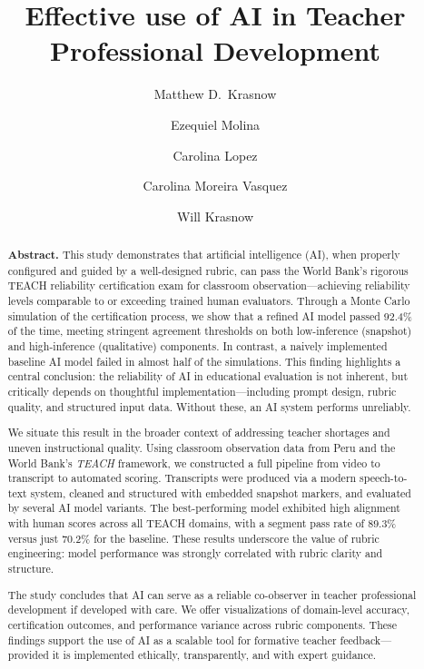 \documentclass[12pt]{article}
\begin{document}
\title{Effective use of AI in Teacher Professional Development}
\author[1]{Matthew D.\ Krasnow}
\author[2]{Ezequiel Molina}
\author[2]{Carolina Lopez}
\author[3]{Carolina Moreira Vasquez}
\author[1]{Will Krasnow}


\date{}
\maketitle

\begin{abstract}
    \noindent \textbf{Abstract.} This study demonstrates that artificial intelligence (AI), when properly configured and guided by a well-designed rubric, can pass the World Bank’s rigorous TEACH reliability certification exam for classroom observation—achieving reliability levels comparable to or exceeding trained human evaluators. Through a Monte Carlo simulation of the certification process, we show that a refined AI model passed 92.4\% of the time, meeting stringent agreement thresholds on both low-inference (snapshot) and high-inference (qualitative) components. In contrast, a naively implemented baseline AI model failed in almost half of the simulations. This finding highlights a central conclusion: the reliability of AI in educational evaluation is not inherent, but critically depends on thoughtful implementation—including prompt design, rubric quality, and structured input data. Without these, an AI system performs unreliably.
    
    We situate this result in the broader context of addressing teacher shortages and uneven instructional quality. Using classroom observation data from Peru and the World Bank’s \textit{TEACH} framework, we constructed a full pipeline from video to transcript to automated scoring. Transcripts were produced via a modern speech-to-text system, cleaned and structured with embedded snapshot markers, and evaluated by several AI model variants. The best-performing model exhibited high alignment with human scores across all TEACH domains, with a segment pass rate of 89.3\% versus just 70.2\% for the baseline. These results underscore the value of rubric engineering: model performance was strongly correlated with rubric clarity and structure.
    
    The study concludes that AI can serve as a reliable co-observer in teacher professional development if developed with care. We offer visualizations of domain-level accuracy, certification outcomes, and performance variance across rubric components. These findings support the use of AI as a scalable tool for formative teacher feedback—provided it is implemented ethically, transparently, and with expert guidance.
    \end{abstract}
\end{document}
